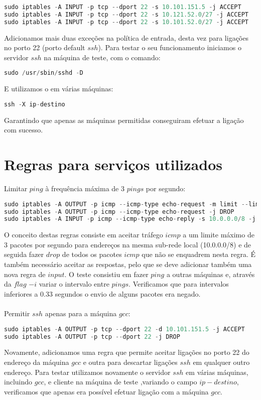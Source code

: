 \documentclass[10pt,a4paper]{report}
\begin{document}
\begin{lstlisting}[language=Java]
sudo iptables -A INPUT -p tcp --dport 22 -s 10.101.151.5 -j ACCEPT
sudo iptables -A INPUT -p tcp --dport 22 -s 10.121.52.0/27 -j ACCEPT
sudo iptables -A INPUT -p tcp --dport 22 -s 10.101.52.0/27 -j ACCEPT
\end{lstlisting}
Adicionamos mais duas exceções na política de entrada, desta vez para ligações no porto 22 (porto default $ssh$). Para testar o seu funcionamento iniciamos o servidor $ssh$ na máquina de teste, com o comando:
\begin{lstlisting}[language=Java]
sudo /usr/sbin/sshd -D
\end{lstlisting}
E utilizamos o em várias máquinas:
\begin{lstlisting}[language=Java]
ssh -X ip-destino
\end{lstlisting} 
Garantindo que apenas as máquinas permitidas conseguiram efetuar a ligação com sucesso.

\section*{Regras para serviços utilizados}
Limitar $ping$ à frequência máxima de 3 $pings$ por segundo:
\begin{lstlisting}[language=Java]
sudo iptables -A OUTPUT -p icmp --icmp-type echo-request -m limit --limit 3/second --limit-burst 3 -d 10.0.0.0/8 -j ACCEPT
sudo iptables -A OUTPUT -p icmp --icmp-type echo-request -j DROP
sudo iptables -A INPUT -p icmp --icmp-type echo-reply -s 10.0.0.0/8 -j ACCEPT
\end{lstlisting}
O conceito destas regras consiste em aceitar tráfego $icmp$ a um limite máximo de 3 pacotes por segundo para endereços na mesma sub-rede local (10.0.0.0/8) e de seguida fazer $drop$ de todos os pacotes $icmp$ que não se enquadrem nesta regra. É também necessário aceitar as respostas, pelo que se deve adicionar também uma nova regra de $input$. O teste consistiu em fazer $ping$ a outras máquinas e, através da $flag$ $-i$ variar o intervalo entre $pings$. Verificamos que para intervalos inferiores a 0.33 segundos o envio de alguns pacotes era negado.\\
\\
Permitir $ssh$ apenas para a máquina $gcc$:
\begin{lstlisting}[language=Java]
sudo iptables -A OUTPUT -p tcp --dport 22 -d 10.101.151.5 -j ACCEPT
sudo iptables -A OUTPUT -p tcp --dport 22 -j DROP
\end{lstlisting}
Novamente, adicionamos uma regra que permite aceitar ligações no porto 22 do endereço da máquina $gcc$ e outra para descartar ligações $ssh$ em qualquer outro endereço. Para testar utilizamos novamente o servidor $ssh$ em várias máquinas, incluindo $gcc$, e cliente na máquina de teste ,variando o campo $ip-destino$, verificamos que apenas era possível efetuar ligação com a máquina $gcc$.
\end{document}
